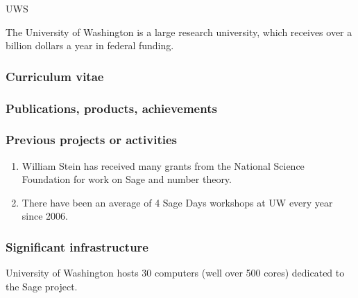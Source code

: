 \begin{sitedescription}{UWS}

%

The University of Washington is a large research university,
which receives over a billion dollars a year in federal funding.

\subsubsection*{Curriculum vitae}



%
%

\subsubsection*{Publications, products, achievements}

\subsubsection*{Previous projects or activities}

\begin{enumerate}
\item William Stein has received many grants from the
National Science Foundation for work on Sage and number theory.
\item  There have been an average of 4 Sage Days workshops at UW
every year since 2006.
\end{enumerate}

\subsubsection*{Significant infrastructure}

University of Washington hosts 30 computers (well over 500 cores)
dedicated to the Sage project.

\end{sitedescription}

